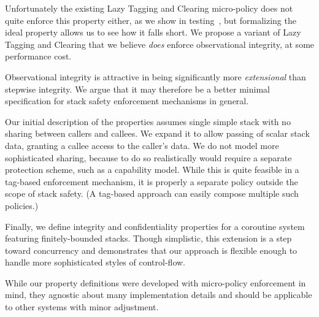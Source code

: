 \documentclass[acmsmall,review,anonymous]{acmart}\settopmatter{printfolios=true,printccs=false,printacmref=false}
\begin{document}
Unfortunately the existing Lazy Tagging and Clearing
micro-policy does not quite enforce this property either, as we show in
testing~, but formalizing the ideal property allows us to see how it falls short.
We propose  a variant of Lazy Tagging and Clearing that we believe \emph{does} enforce observational integrity,
at some performance cost.

Observational integrity is attractive in being significantly more \emph{extensional} than
stepwise integrity.  We argue that it may therefore be a better minimal specification for
stack safety enforcement mechanisms in general.

Our initial description of the properties assumes single simple stack with no sharing between callers and
callees.  We expand it to allow passing of scalar stack data, granting a callee
access to the caller's data. We do not model more sophisticated sharing, because to do
so realistically would require a separate protection scheme, such as a capability
model. While this is quite feasible in a tag-based enforcement mechanism, it is properly
a separate policy outside the scope of stack safety. (A tag-based approach can easily
compose multiple such policies.)

Finally, we define integrity and confidentiality properties for a coroutine system featuring finitely-bounded stacks.
Though simplistic, this extension is a step toward concurrency and demonstrates that
our approach is flexible enough to handle more sophisticated styles of control-flow.

While our property definitions were developed with micro-policy enforcement in mind, they
agnostic about many implementation details and should be applicable to other
systems with minor adjustment.

\end{document}

